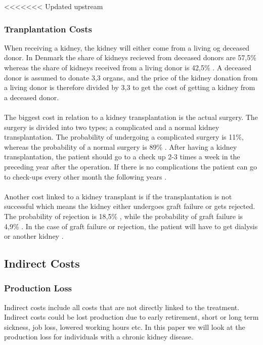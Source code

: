 \documentclass[a4paper,12pt]{article}
\begin{document}
<<<<<<< Updated upstream
\subsubsection*{Tranplantation Costs}

When receiving a kidney, the kidney will either come from a living og deceased donor. In Denmark the share of kidneys recieved from deceased donors are 57,5\% whereas the share of kidneys received from a living donor is  42,5\% \cite{DNSL}. A deceased donor is assumed to donate 3,3 organs, and the price of the kidney donation from a living donor  is therefore divided by 3,3 to get the cost of getting a kidney from a deceased donor. 
\\\\
The biggest cost in relation to a kidney  transplantation is the actual surgery. The surgery is divided into two types; a complicated and a normal kidney transplantation. The probability of undergoing a complicated surgery is 11\%, whereas the probability of a normal surgery is 89\% \cite{esundhed} \cite{CUAdkartikel}. After having a kidney transplantation, the patient should go to a check up 2-3 times a week in the preceding year after the operation. If there is no complications the patient can go to check-ups every other month the following years \cite{Rigshospitalet}. 
\\\\
Another cost linked to a kidney transplant is if the transplantation is not successful which means the kidney either undergoes graft failure or gets rejected. The probability of rejection is 18,5\% \cite{Rigshospitalet}, while the probability of graft failure is 4,9\% \cite{DNSL}. In the case of graft failure or rejection, the patient will have to get dialysis or another kidney \cite{Rigshospitalet}.

\subsection{Indirect Costs}

\subsubsection*{Production Loss}
Indirect costs include all costs that are not directly linked to the treatment. Indirect costs could be lost production due to early retirement, short or long term sickness, job loss, lowered working hours etc. In this paper we will look at the production loss for individuals with a chronic kidney disease. 
\end{document}
